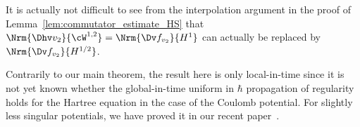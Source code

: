 \begin{remark}
It is actually not difficult to see from the interpolation argument in the proof of Lemma~\ref{lem:commutator_estimate_HS} that $\Nrm{\Dhv v_2}{\cW^{1,2}} = \Nrm{\Dv f_{v_2}}{H^1}$ can actually be replaced by $\Nrm{\Dv f_{v_2}}{H^{1/2}}$.
\end{remark}

\begin{remark}
Contrarily to our main theorem, the result here is only local-in-time since it is not yet known whether the global-in-time uniform in $\hbar$ propagation of regularity holds for the Hartree equation in the case of the Coulomb potential. For slightly less singular potentials, we have proved it in our recent paper~\cite{chong_global--time_2022}.
\end{remark}


